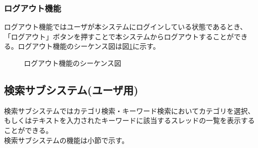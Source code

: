 \documentclass[a4j]{jarticle}
\begin{document}
  \subsubsection{ログアウト機能}
  ログアウト機能ではユーザが本システムにログインしている状態であるとき、「ログアウト」ボタンを押すことで本システムからログアウトすることができる。ログアウト機能のシーケンス図は図\ref{fig:login_logout.png}に示す。
  \begin{figure}[H]
    \centering
    \caption{ログアウト機能のシーケンス図}
    \label{fig:login_logout.png}
  \end{figure}
  \subsection{検索サブシステム(ユーザ用)}
  検索サブシステムではカテゴリ検索・キーワード検索においてカテゴリを選択、もしくはテキストを入力されたキーワードに該当するスレッドの一覧を表示することができる。\\
  検索サブシステムの機能は小節で示す。
\end{document}
